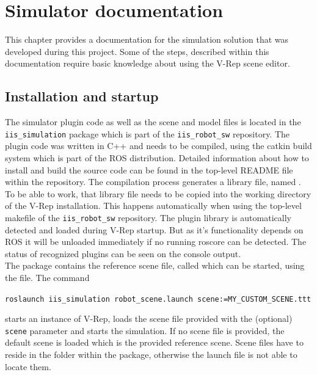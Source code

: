 
\chapter{Simulator documentation}
\label{app:sim_doc}

This chapter provides a documentation for the simulation solution that was developed during this project. 
Some of the steps, described within this documentation require basic knowledge about using the V-Rep scene editor.


\section{Installation and startup}

The simulator plugin code as well as the scene and model files is located in the \texttt{iis\_simulation} package which is part of the \texttt{iis\_robot\_sw} repository. The plugin code was written in C++ and needs to be compiled, using the catkin build system which is part of the ROS distribution. Detailed information about how to install and build the source code can be found in the top-level README file within the repository. The compilation process generates a library file, named . To be able to work, that library file needs to be copied into the working directory of the V-Rep installation. This happens automatically when using the top-level makefile of the \texttt{iis\_robot\_sw} repository. The plugin library is automatically detected and loaded during V-Rep startup. But as it's functionality depends on ROS it will be unloaded immediately if no running roscore can be detected. The status of recognized plugins can be seen on the console output. \\

The package contains the reference scene file, called  which can be started, using the  file. The command
\begin{center}
\texttt{roslaunch iis\_simulation robot\_scene.launch scene:=MY\_CUSTOM\_SCENE.ttt}
\end{center}
starts an instance of V-Rep, loads the scene file provided with the (optional) \texttt{scene} parameter and starts the simulation. If no scene file is provided, the default scene is loaded which is the provided reference scene. Scene files have to reside in the  folder within the package, otherwise the launch file is not able to locate them.

